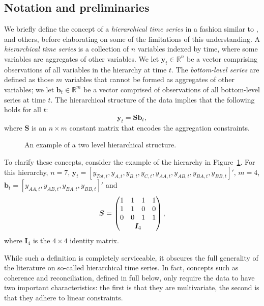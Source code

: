 \documentclass[12pt]{article}
\theoremstyle{definition}
\begin{document}
\subsection{Notation and preliminaries}\label{sec:notation}

We briefly define the concept of a \emph{hierarchical time series} in a fashion similar to \citet{AthEtAl2019_MacroBook}, \citet{FPP2018} and others, before elaborating on some of the limitations of this understanding. A \emph{hierarchical time series} is a collection of $n$ variables indexed by time, where some variables are aggregates of other variables. We let $\bm{y}_t \in \mathbb{R}^n$ be a vector comprising observations of all variables in the hierarchy at time $t$. The \emph{bottom-level series} are defined as those $m$ variables that cannot be formed as aggregates of other variables; we let $\bm{b}_t \in \mathbb{R}^m$ be a vector comprised of observations of all bottom-level series at time $t$. The hierarchical structure of the data implies that the following holds for all $t$:
\begin{equation*}
  \bm{y}_t = \bm{S}\bm{b}_t,
\end{equation*}
where $\bm{S}$ is an $n \times m$ constant matrix that encodes the aggregation constraints.

\begin{figure}[!hbt]
  \begin{center}
     
				 
				\qobitree
			\end{center}
  \caption{An example of a two level hierarchical structure.}\label{fig:basichier}
\end{figure}

To clarify these concepts, consider the example of the hierarchy in Figure~\ref{fig:basichier}. For this hierarchy, $n=7$, $\bm{y}_t = [y_{Tot,t},y_{A,t}, y_{B,t},y_{C,t},y_{AA,t}, y_{AB,t}, y_{BA,t}, y_{BB,t}]'$, $m=4$, $\bm{b}_t = [y_{AA,t}, y_{AB,t}, y_{BA,t}, y_{BB,t}]'$ and
\[
  \bm{S} = \begin{pmatrix}
	1 & 1 & 1 & 1  \\
	1 & 1 & 0 & 0 \\
	0 & 0 & 1 & 1 \\
	& \multicolumn{2}{c}{\bm{I}_4} &
	\end{pmatrix},
\]
where $\bm{I}_4$ is the $4\times 4$ identity matrix.

While such a definition is completely serviceable, it obscures the full generality of the literature on so-called hierarchical time series. In fact, concepts such as coherence and reconciliation, defined in full below, only require the data to have two important characteristics: the first is that they are multivariate, the second is that they adhere to linear constraints.
\end{document}
